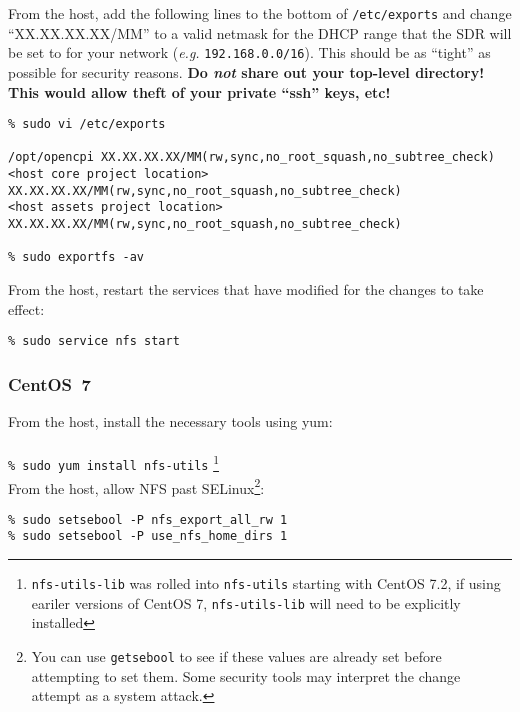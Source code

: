 From the host, add the following lines to the bottom of \texttt{/etc/exports} and change ``XX.XX.XX.XX/MM'' to a valid netmask for the DHCP range that the SDR will be set to for your network (\textit{e.g.} \texttt{192.168.0.0/16}).
This should be as ``tight'' as possible for security reasons. \textbf{Do \textit{not} share out your top-level directory! This would allow theft of your private ``ssh'' keys, etc!} %
\begin{verbatim}
% sudo vi /etc/exports

/opt/opencpi XX.XX.XX.XX/MM(rw,sync,no_root_squash,no_subtree_check)
<host core project location> XX.XX.XX.XX/MM(rw,sync,no_root_squash,no_subtree_check)
<host assets project location> XX.XX.XX.XX/MM(rw,sync,no_root_squash,no_subtree_check)

% sudo exportfs -av
\end{verbatim}

From the host, restart the services that have modified for the changes to take effect:
\begin{verbatim}
% sudo service nfs start
\end{verbatim}

\subsubsection{CentOS~7}
From the host, install the necessary tools using yum:\\
~\\
\verb+% sudo yum install nfs-utils+ \footnote{\texttt{nfs-utils-lib} was rolled into \texttt{nfs-utils} starting with CentOS 7.2, if using eariler versions of CentOS 7, \texttt{nfs-utils-lib} will need to be explicitly installed}
~\\

From the host, allow NFS past SELinux\footnote{You can use \texttt{getsebool} to see if these values are already set before attempting to set them. Some security tools may interpret the change attempt as a system attack.}:
\begin{verbatim}
% sudo setsebool -P nfs_export_all_rw 1
% sudo setsebool -P use_nfs_home_dirs 1
\end{verbatim}

